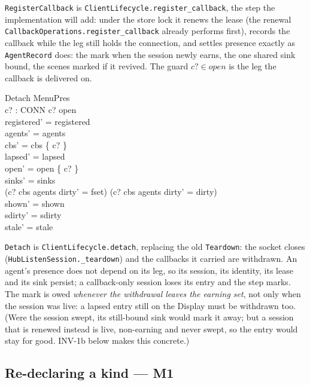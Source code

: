 \documentclass[a4paper,10pt,fleqn]{article}
\begin{document}
\texttt{RegisterCallback} is \texttt{ClientLifecycle.register\_callback}, the
step the implementation will add: under the store lock it renews the lease (the
renewal \texttt{CallbackOperations.register\_callback} already performs first),
records the callback while the leg still holds the connection, and settles
presence exactly as \texttt{AgentRecord} does: the mark when the session newly
earns, the one shared sink bound, the scenes marked if it revived. The guard
$c? \in open$ is the leg the callback is delivered on.

\begin{schema}{Detach}
  \Delta MenuPres \\
  c? : CONN
\where
  c? \in open \\
  registered' = registered \\
  agents' = agents \\
  cbs' = cbs \setminus \{ c? \} \\
  lapsed' = lapsed \\
  open' = open \setminus \{ c? \} \\
  sinks' = sinks \\
  (c? \in cbs \setminus agents \land dirty' = fset) \lor
    (c? \notin cbs \setminus agents \land dirty' = dirty) \\
  shown' = shown \\
  sdirty' = sdirty \\
  stale' = stale
\end{schema}

\texttt{Detach} is \texttt{ClientLifecycle.detach}, replacing the old
\texttt{Teardown}: the socket closes (\texttt{HubListenSession.\_teardown}) and
the callbacks it carried are withdrawn. An agent's presence does not depend on
its leg, so its session, its identity, its lease and its sink persist; a
callback-only session loses its entry and the step marks. The mark is owed
\emph{whenever the withdrawal leaves the earning set}, not only when the
session was live: a lapsed entry still on the Display must be withdrawn too.
(Were the session swept, its still-bound sink would mark it away; but a session
that is renewed instead is live, non-earning and never swept, so the entry
would stay for good. INV-1b below makes this concrete.)

\subsection{Re-declaring a kind --- M1}
\end{document}
